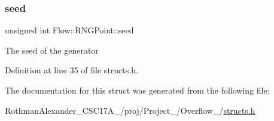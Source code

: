 \subsubsection{\texorpdfstring{seed}{seed}}
{\footnotesize\ttfamily unsigned int Flow\+::\+R\+N\+G\+Point\+::seed}

The seed of the generator 

Definition at line 35 of file structs.\+h.



The documentation for this struct was generated from the following file\+:\begin{DoxyCompactItemize}
\item 
Rothman\+Alexander\+\_\+\+C\+S\+C17\+A\+\_/proj/\+Project\+\_/\+Overflow\+\_/\hyperlink{structs_8h}{structs.\+h}\end{DoxyCompactItemize}
